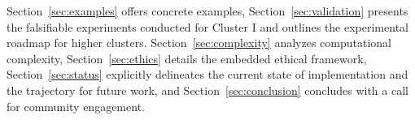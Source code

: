 Section~\ref{sec:examples} offers concrete examples, Section~\ref{sec:validation} presents the falsifiable experiments conducted for Cluster I and outlines the experimental roadmap for higher clusters. Section~\ref{sec:complexity} analyzes computational complexity, Section~\ref{sec:ethics} details the embedded ethical framework, Section~\ref{sec:status} explicitly delineates the current state of implementation and the trajectory for future work, and Section~\ref{sec:conclusion} concludes with a call for community engagement.